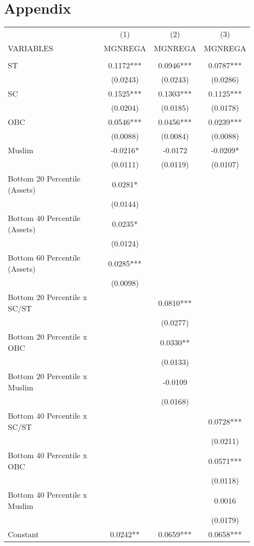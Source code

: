 \documentclass{article}
\begin{document}
\section{Appendix}
\label{appendix}
\begin{table}[]
\small
    \centering
    \begin{tabular}{lccc} \hline
 & (1) & (2) & (3) \\
VARIABLES & MGNREGA & MGNREGA & MGNREGA \\ \hline
 &  &  &  \\
ST & 0.1172*** & 0.0946*** & 0.0787*** \\
 & (0.0243) & (0.0243) & (0.0286) \\
SC & 0.1525*** & 0.1303*** & 0.1125*** \\
 & (0.0204) & (0.0185) & (0.0178) \\
OBC & 0.0546*** & 0.0456*** & 0.0239*** \\
 & (0.0088) & (0.0084) & (0.0088) \\
Muslim & -0.0216* & -0.0172 & -0.0209* \\
 & (0.0111) & (0.0119) & (0.0107) \\
Bottom 20 Percentile (Assets) & 0.0281* &  &  \\
 & (0.0144) &  &  \\
Bottom 40 Percentile (Assets) & 0.0235* &  &  \\
 & (0.0124) &  &  \\
Bottom 60 Percentile (Assets) & 0.0285*** &  &  \\
 & (0.0098) &  &  \\
Bottom 20 Percentile x SC/ST &  & 0.0810*** &  \\
 &  & (0.0277) &  \\
Bottom 20 Percentile x OBC &  & 0.0330** &  \\
 &  & (0.0133) &  \\
Bottom 20 Percentile x Muslim &  & -0.0109 &  \\
 &  & (0.0168) &  \\
Bottom 40 Percentile x SC/ST &  &  & 0.0728*** \\
 &  &  & (0.0211) \\
Bottom 40 Percentile x OBC &  &  & 0.0571*** \\
 &  &  & (0.0118) \\
Bottom 40 Percentile x Muslim &  &  & 0.0016 \\
 &  &  & (0.0179) \\
Constant & 0.0242** & 0.0659*** & 0.0658*** \\

\end{tabular}
\end{table}
\end{document}
